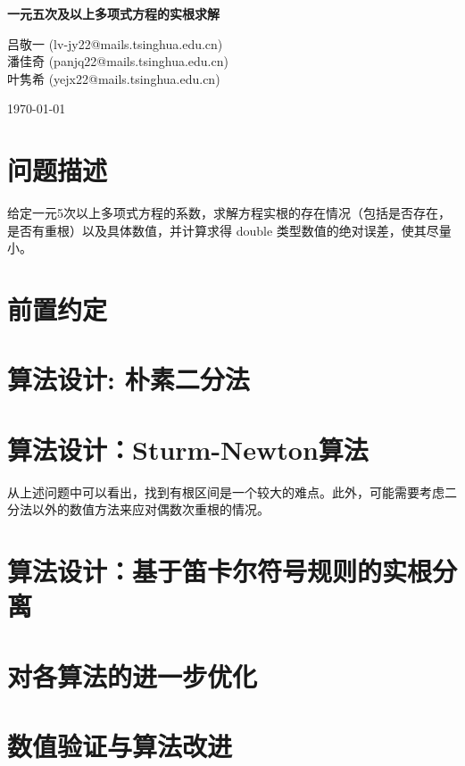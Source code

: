 \documentclass{ctexart}
\begin{document}
	
	\begin{titlepage}
    
    \centering
    \vspace*{\fill}
    
    \vspace*{0.5cm}
    
    \huge\bfseries
    一元五次及以上多项式方程的实根求解
    
	\vspace*{0.5cm}
	
	\large 吕敬一 (lv-jy22@mails.tsinghua.edu.cn) \\ 潘佳奇 (panjq22@mails.tsinghua.edu.cn) \\ 叶隽希 (yejx22@mails.tsinghua.edu.cn)
	
	\today
	
	\vspace*{\fill}
	
	\end{titlepage}

    \tableofcontents
    \clearpage

	\section{问题描述}
		给定一元5次以上多项式方程的系数，求解方程实根的存在情况（包括是否存在，是否有重根）以及具体数值，并计算求得 double 类型数值的绝对误差，使其尽量小。

	\section{前置约定}

	

	\section{算法设计: 朴素二分法}
	
	
	
	\section{算法设计：Sturm-Newton算法}
	
	从上述问题中可以看出，找到有根区间是一个较大的难点。此外，可能需要考虑二分法以外的数值方法来应对偶数次重根的情况。
	
	
	
	\section{算法设计：基于笛卡尔符号规则的实根分离}
	
	

	\section{对各算法的进一步优化}
	
	

	\section{数值验证与算法改进}
	
	
\end{document}
